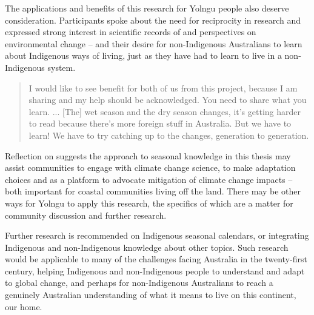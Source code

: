 The applications and benefits of this research for Yolngu people also deserve
consideration.  Participants spoke about the need for reciprocity in research
and expressed strong interest in scientific records of and perspectives on
environmental change -- and their desire for non-Indigenous Australians to
learn about Indigenous ways of living, just as they have had to learn to
live in a non-Indigenous system.
\begin{quote}
    I would like to see benefit for both of us from this project, because I am
    sharing and my help should be acknowledged.  You need to share what you learn. ...
    [The] wet season and the dry season changes, it's getting harder to read
    because there's more foreign stuff in Australia.  But we have to learn!
    We have to try catching up to the changes, generation to generation.
\end{quote}
Reflection on \citet{petheram2010} suggests the approach to seasonal knowledge in this thesis
may assist communities to engage with climate change science, to make
adaptation choices and as a platform to advocate mitigation of climate change impacts -- both
important for coastal communities living off the land.  There may be other
ways for Yolngu to apply this research, the specifics of which are a matter for
community discussion and further research.


Further research is recommended on Indigenous seasonal calendars, or
integrating Indigenous and non-Indigenous knowledge about other topics.  Such
research would be applicable to many of the challenges facing
Australia in the twenty-first century, helping Indigenous and non-Indigenous
people to understand and adapt to global change, and perhaps for non-Indigenous
Australians to reach a genuinely Australian understanding of what it means to
live on this continent, our home.

